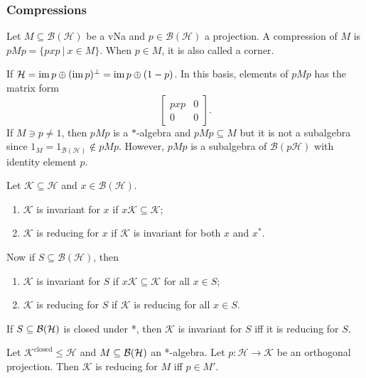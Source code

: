 \subsubsection*{Compressions}

\begin{definition}
  Let $M \subseteq \mathcal{B}(\mathcal{H})$ be a vNa and $p \in \mathcal{B}(\mathcal{H})$ a projection.
  A compression of $M$ is $p M p = \{pxp\ |\ x \in M\}$.
  When $p \in M$, it is also called a corner.
\end{definition}

If $\mathcal{H} = \operatorname{im} p \oplus (\operatorname{im} p)^{\perp} = \operatorname{im} p \oplus (1 - p)$.
In this basis, elements of $p M p$ has the matrix form 
$$\begin{bmatrix}
  pxp & 0\\
  0 & 0
\end{bmatrix}.$$
If $M \ni p \neq 1$, then $pMp$ is a $*$-algebra and $pMp \subseteq M$
but it is not a subalgebra since $1_{M} = 1 _{\mathcal{B}(\mathcal{H})} \notin pMp$.
However, $pM p$ is a subalgebra of $\mathcal{B}(p\mathcal{H})$ with identity element $p$. 

\begin{definition}
  Let $\mathcal{K} \subseteq \mathcal{H}$ and $x \in \mathcal{B}(\mathcal{H})$.
  \begin{enumerate}
    \item $\mathcal{K}$ is invariant for $x$ if $x \mathcal{K} \subseteq \mathcal{K}$;
    \item $\mathcal{K}$ is reducing for $x$ if $\mathcal{K}$ is invariant for both $x$ and $x^*$.
  \end{enumerate}
  Now if $S \subseteq \mathcal{B}(\mathcal{H})$, then 
  \begin{enumerate}
    \item $\mathcal{K}$ is invariant for $S$ if $x \mathcal{K} \subseteq \mathcal{K}$ for all $x \in S$;
    \item $\mathcal{K}$ is reducing for $S$ if $\mathcal{K}$ is reducing for all $x \in S$.
  \end{enumerate}
\end{definition}

If $S \subseteq \operatorname{\mathcal{B} (\mathcal{H})}$ is closed under *, then $\mathcal{K}$ is invariant for $S$ iff it is reducing for $S$. 

\begin{lemma}\label{lem:1}
  Let $\mathcal{K}^{\mathrm{closed}} \leq \mathcal{H}$ and $M \subseteq \operatorname{\mathcal{B} (\mathcal{H})}$ an *-algebra.
  Let $p: \mathcal{H} \to \mathcal{K}$ be an orthogonal projection. Then $\mathcal{K}$ is reducing for $M$ iff $p \in M'$.
\end{lemma}

